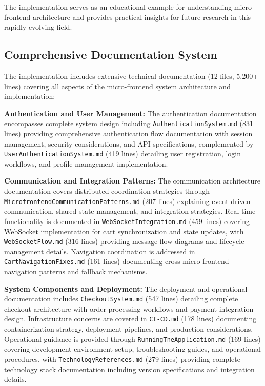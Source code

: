 \documentclass[12pt,a4paper]{report}
\begin{document}
The implementation serves as an educational example for understanding micro-frontend architecture and provides practical insights for future research in this rapidly evolving field.

\subsection{Comprehensive Documentation System}

The implementation includes extensive technical documentation (12 files, 5,200+ lines) covering all aspects of the micro-frontend system architecture and implementation:

\textbf{Authentication and User Management:} The authentication documentation encompasses complete system design including \texttt{AuthenticationSystem.md} (831 lines) providing comprehensive authentication flow documentation with session management, security considerations, and API specifications, complemented by \texttt{UserAuthenticationSystem.md} (419 lines) detailing user registration, login workflows, and profile management implementation.

\textbf{Communication and Integration Patterns:} The communication architecture documentation covers distributed coordination strategies through \texttt{MicrofrontendCommunicationPatterns.md} (207 lines) explaining event-driven communication, shared state management, and integration strategies. Real-time functionality is documented in \texttt{WebSocketIntegration.md} (459 lines) covering WebSocket implementation for cart synchronization and state updates, with \texttt{WebSocketFlow.md} (316 lines) providing message flow diagrams and lifecycle management details. Navigation coordination is addressed in \texttt{CartNavigationFixes.md} (161 lines) documenting cross-micro-frontend navigation patterns and fallback mechanisms.

\textbf{System Components and Deployment:} The deployment and operational documentation includes \texttt{CheckoutSystem.md} (547 lines) detailing complete checkout architecture with order processing workflows and payment integration design. Infrastructure concerns are covered in \texttt{CI-CD.md} (178 lines) documenting containerization strategy, deployment pipelines, and production considerations. Operational guidance is provided through \texttt{RunningTheApplication.md} (169 lines) covering development environment setup, troubleshooting guides, and operational procedures, with \texttt{TechnologyReferences.md} (279 lines) providing complete technology stack documentation including version specifications and integration details.
\end{document}
